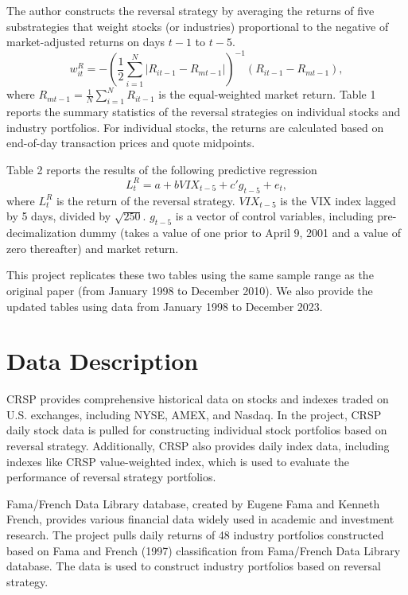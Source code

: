 \documentclass[11pt]{article}
\begin{document}
The author constructs the reversal strategy by averaging the returns of five substrategies
that weight stocks (or industries) proportional to the negative of market-adjusted returns
on days $t-1$ to $t-5$.
\begin{equation}
    w_{it}^R = -\left( \frac{1}{2} \sum_{i=1}^{N} \left| R_{it-1} - R_{mt-1} \right| \right)^{-1} \left( R_{it-1} - R_{mt-1} \right),
\end{equation}
where $R_{mt-1} = \frac{1}{N}\sum_{i=1}^N R_{it-1}$ is the equal-weighted market return.
Table 1 reports the summary statistics of the reversal strategies on individual stocks 
and industry portfolios. For individual stocks, the returns are calculated based on 
end-of-day transaction prices and quote midpoints.

Table 2 reports the results of the following predictive regression
\begin{equation}
    L_t^R = a + bVIX_{t-5} + c'g_{t-5} + e_t,
\end{equation}
where $L_t^R$ is the return of the reversal strategy. $VIX_{t-5}$ is the VIX index lagged
by 5 days, divided by $\sqrt{250}$. $g_{t-5}$ is a vector of control variables, including 
pre-decimalization dummy (takes a value of one prior to April 9, 2001 and a value of zero 
thereafter) and market return.

This project replicates these two tables using the same sample range as the original
paper (from January 1998 to December 2010). We also provide the updated tables using
data from January 1998 to December 2023.
\section{Data Description}
CRSP provides comprehensive historical data on stocks and indexes traded on U.S. exchanges, 
including NYSE, AMEX, and Nasdaq. In the project, CRSP daily stock data is pulled for 
constructing individual stock portfolios based on reversal strategy. Additionally, CRSP also 
provides daily index data, including indexes like CRSP value-weighted index, which is used 
to evaluate the performance of reversal strategy portfolios.

Fama/French Data Library database, created by Eugene Fama and Kenneth French, provides various 
financial data widely used in academic and investment research. The project pulls daily 
returns of 48 industry portfolios constructed based on Fama and French (1997) classification
from Fama/French Data Library database. The data is used to construct industry portfolios based
on reversal strategy.
\end{document}
